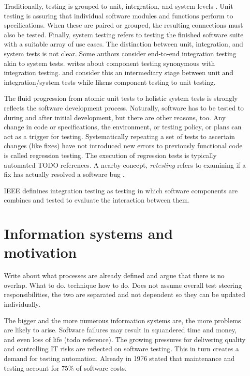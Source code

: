 \documentclass[12pt,a4paper,oneside,pdftex]{report}
\begin{document}
Traditionally, testing is grouped to unit, integration, and system levels \citep{jenkins2008software, burnstein2003practical}. Unit testing is assuring that individual software modules and functions perform to specifications. When these are paired or grouped, the resulting connections must also be tested. Finally, system testing refers to testing the finished software suite with a suitable array of use cases. The distinction between unit, integration, and system tests is not clear. Some authors consider end-to-end integration testing akin to system tests. \citet{duvall2007continuous} writes about component testing synonymous with integration testing. \citet{pezze2008software} and \citet{benz2007combining} consider this an intermediary stage between unit and integration/system tests while \citet{burnstein2003practical} likens component testing to unit testing.

The fluid progression from atomic unit tests to holistic system tests is strongly reflects the software development process. Naturally, software has to be tested to during and after initial development, but there are other reasons, too. Any change in code or specifications, the environment, or testing policy, or plans can act as a trigger for testing. Systematically repeating a set of tests to ascertain changes (like fixes) have not introduced new errors to previously functional code is called regression testing. The execution of regression tests is typically automated TODO references. A nearby concept, \textit{retesting} refers to examining if a fix has actually resolved a software bug \citep{jenkins2008software}.

IEEE definines integration testing as testing in which software components are combines and tested to evaluate the interaction between them. 

\section{Information systems and motivation}

Write about what processes are already defined and argue that there is no overlap. What to do. technique how to do. Does not assume overall test steering responsibilities, the two are separated and not dependent so they can be updated individually.

The bigger and the more numerous information systems are, the more problems are likely to arise. Software failures may result in squandered time and money, and even loss of life (todo reference). The growing pressures for delivering quality and controlling IT risks are reflected on software testing. This in turn creates a demand for testing automation. Already in 1976 \citet{myers1976software} stated that maintenance and testing account for 75\% of software costs.
\end{document}
